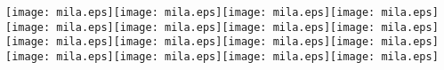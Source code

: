\documentclass{standalone}
\newcommand{\glumarko}{\texttt{[image: mila.eps]}}
\begin{document}
\begin{minipage}{\paperwidth}
\glumarko\hfill\glumarko\hfill\glumarko\hfill\glumarko\\
\glumarko\hfill\glumarko\hfill\glumarko\hfill\glumarko\\
\glumarko\hfill\glumarko\hfill\glumarko\hfill\glumarko\\
\glumarko\hfill\glumarko\hfill\glumarko\hfill\glumarko
\end{minipage}
\end{document}

